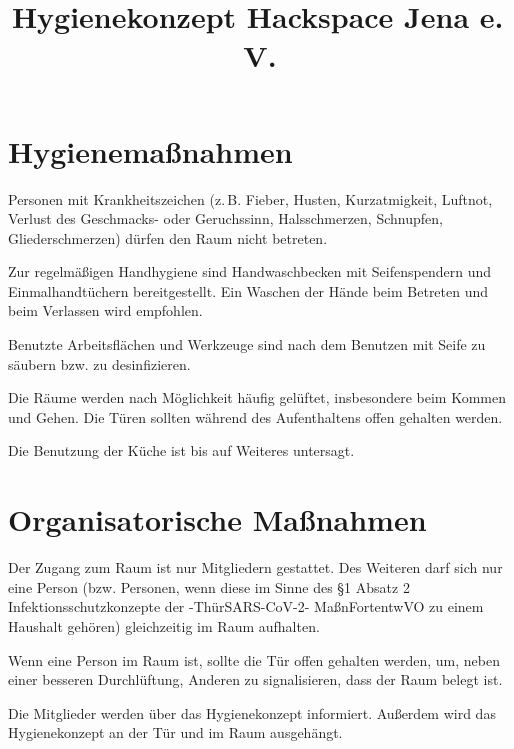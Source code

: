 \documentclass[a4paper,12pt,parskip=half]{scrartcl}
\title{Hygienekonzept Hackspace Jena e.\,V.}
\begin{document}
\maketitle

\section*{Hygienemaßnahmen}

Personen mit Krankheitszeichen (z.\,B. Fieber, Husten, Kurzatmigkeit, Luftnot, Verlust des
Geschmacks- oder Geruchssinn, Halsschmerzen, Schnupfen, Gliederschmerzen) dürfen den Raum nicht betreten.

Zur regelmäßigen Handhygiene sind Handwaschbecken mit Seifenspendern und
Einmalhandtüchern bereitgestellt. Ein Waschen der Hände beim Betreten und beim Verlassen wird empfohlen.

Benutzte Arbeitsflächen und Werkzeuge sind nach dem Benutzen mit Seife zu säubern bzw. zu desinfizieren.

Die Räume werden nach Möglichkeit häufig gelüftet, insbesondere beim Kommen und Gehen. Die Türen sollten während des Aufenthaltens offen gehalten werden.

Die Benutzung der Küche ist bis auf Weiteres untersagt.

\section*{Organisatorische Maßnahmen}

Der Zugang zum Raum ist nur Mitgliedern gestattet. Des Weiteren darf sich nur eine Person (bzw. Personen, wenn diese im Sinne des §1 Absatz 2 Infektionsschutzkonzepte der -ThürSARS-CoV-2-
MaßnFortentwVO zu einem Haushalt gehören) gleichzeitig im Raum aufhalten.

Wenn eine Person im Raum ist, sollte die Tür offen gehalten werden, um, neben einer besseren Durchlüftung, Anderen zu signalisieren, dass der Raum belegt ist. 

Die Mitglieder werden über das Hygienekonzept informiert. Außerdem wird das Hygienekonzept an der Tür und im Raum ausgehängt.
\end{document}
